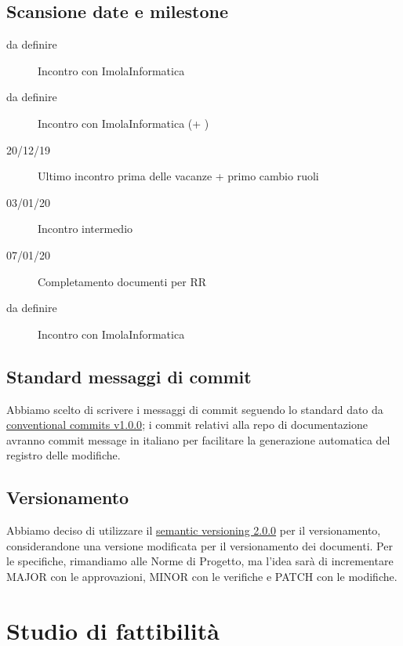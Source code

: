 \documentclass{article}
\begin{document}
\subsection{Scansione date e milestone}%
\label{sub:scansione_date_e_milestone}

\begin{description}
  \item[da definire] Incontro con ImolaInformatica
  \item[da definire] Incontro con ImolaInformatica (+ \varepsilon)
  \item[20/12/19] Ultimo incontro prima delle vacanze + primo cambio ruoli
  \item[03/01/20] Incontro intermedio
  \item[07/01/20] Completamento documenti per RR
  \item[da definire] Incontro con ImolaInformatica
\end{description}

\subsection{Standard messaggi di commit}%
\label{sub:standard_messaggi_di_commit}

Abbiamo scelto di scrivere i messaggi di commit seguendo lo standard dato da \href{https://www.conventionalcommits.org/en/v1.0.0/}{conventional commits v1.0.0};
i commit relativi alla repo di documentazione avranno commit message in italiano per facilitare la generazione automatica del registro delle modifiche.

\subsection{Versionamento}%
\label{sub:versionamento}
Abbiamo deciso di utilizzare il \href{https://semver.org/}{semantic versioning 2.0.0} per il versionamento, considerandone una versione modificata per il versionamento dei documenti.
Per le specifiche, rimandiamo alle Norme di Progetto, ma l'idea sarà di incrementare MAJOR con le approvazioni, MINOR con le verifiche e PATCH con le modifiche.

\section{Studio di fattibilità}%
\label{sec:studio_di_fattibilità}
\end{document}
